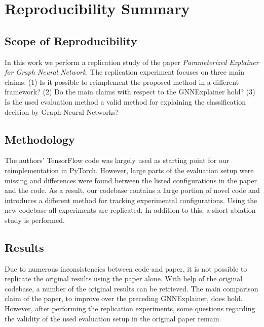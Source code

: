 
\section*{\centering Reproducibility Summary}

\subsection*{Scope of Reproducibility}

In this work we perform a replication study of the paper \textit{Parameterized Explainer for Graph Neural Network}. The replication experiment focuses on three main claims: (1) Is it possible to reimplement the proposed method in a different framework? (2) Do the main claims with respect to the GNNExplainer hold? (3) Is the used evaluation method a valid method for explaining the classification decision by Graph Neural Networks? 

\subsection*{Methodology}

The authors' TensorFlow code was largely used as starting point for our reimplementation in PyTorch. However, large parts of the evaluation setup were missing and differences were found between the listed configurations in the paper and the code. As a result, our codebase contains a large portion of novel code and introduces a different method for tracking experimental configurations. Using the new codebase all experiments are replicated. In addition to this, a short ablation study is performed.


\subsection*{Results}
Due to numerous inconsistencies between code and paper, it is not possible to replicate the original results using the paper alone. With help of the original codebase, a number of the original results can be retrieved. The main comparison claim of the paper, to improve over the preceding GNNExplainer, does hold. However, after performing the replication experiments, some questions regarding the validity of the used evaluation setup in the original paper remain. 


